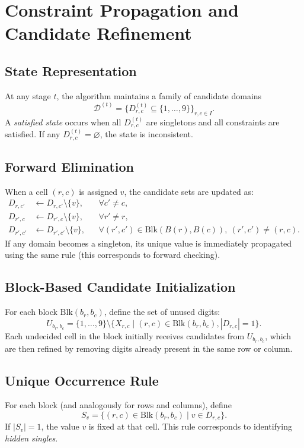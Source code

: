 \documentclass[a4paper,11pt]{article}
\begin{document}
\section{Constraint Propagation and Candidate Refinement}

\subsection{State Representation}
At any stage \(t\), the algorithm maintains a family of candidate domains
\[
\mathcal{D}^{(t)} = \{ D_{r,c}^{(t)} \subseteq \{1, \dots, 9\} \}_{r,c \in I}.
\]
A \emph{satisfied state} occurs when all \(D_{r,c}^{(t)}\) are singletons and all constraints are satisfied.
If any \(D_{r,c}^{(t)} = \varnothing\), the state is inconsistent.

\subsection{Forward Elimination}
When a cell \((r,c)\) is assigned \(v\), the candidate sets are updated as:
\begin{align*}
D_{r,c'} &\gets D_{r,c'} \setminus \{v\}, && \forall c' \neq c,\\
D_{r',c} &\gets D_{r',c} \setminus \{v\}, && \forall r' \neq r,\\
D_{r',c'} &\gets D_{r',c'} \setminus \{v\}, && \forall (r',c') \in \mathrm{Blk}(B(r),B(c)),\ (r',c')\neq(r,c).
\end{align*}
If any domain becomes a singleton, its unique value is immediately propagated using the same rule (this corresponds to forward checking).

\subsection{Block-Based Candidate Initialization}
For each block \(\mathrm{Blk}(b_r,b_c)\), define the set of unused digits:
\[
U_{b_r,b_c} = \{1,\dots,9\} \setminus \{ X_{r,c} \mid (r,c)\in \mathrm{Blk}(b_r,b_c), |D_{r,c}|=1 \}.
\]
Each undecided cell in the block initially receives candidates from \(U_{b_r,b_c}\), which are then refined by removing digits already present in the same row or column.

\subsection{Unique Occurrence Rule}
For each block (and analogously for rows and columns), define
\[
S_v = \{ (r,c) \in \mathrm{Blk}(b_r,b_c) \mid v \in D_{r,c} \}.
\]
If \(|S_v|=1\), the value \(v\) is fixed at that cell.  
This rule corresponds to identifying \emph{hidden singles}.
\end{document}
